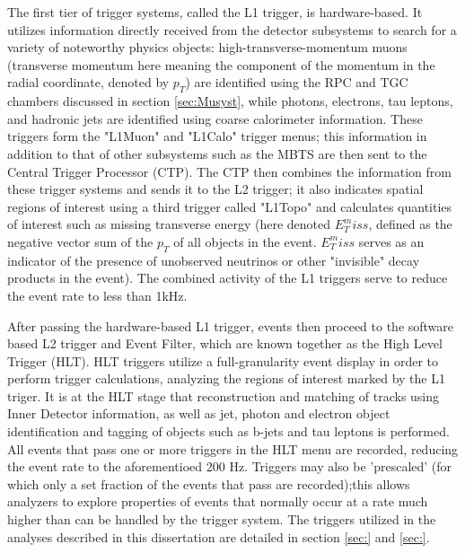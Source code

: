 The first tier of trigger systems, called the L1 trigger, is hardware-based. It utilizes information directly received from the detector subsystems to search for a variety of noteworthy physics objects: high-transverse-momentum muons (transverse momentum here meaning the component of the momentum in the radial coordinate, denoted by $p_T$) are identified using the RPC and TGC chambers discussed in section \ref{sec:Musyst}, while photons, electrons, tau leptons, and hadronic jets are identified using coarse calorimeter information. These triggers form the "L1Muon" and "L1Calo" trigger menus; this information in addition to that of other subsystems such as the MBTS are then sent to the Central Trigger Processor (CTP). The CTP then combines the information from these trigger systems and sends it to the L2 trigger; it also indicates spatial regions of interest using a third trigger called "L1Topo" and calculates quantities of interest such as missing transverse energy (here denoted $E_T^miss$, defined as the negative vector sum of the $p_T$ of all objects in the event. $E_T^miss$ serves as an indicator of the presence of unobserved neutrinos or other "invisible" decay products in the event). The combined activity of the L1 triggers serve to reduce the event rate to less than 1kHz.

After passing the hardware-based L1 trigger, events then proceed to the software based L2 trigger and Event Filter, which are known together as the High Level Trigger (HLT). HLT triggers utilize a full-granularity event display in order to perform trigger calculations, analyzing the regions of interest marked by the L1 triger. It is at the HLT stage that reconstruction and matching of tracks using Inner Detector information, as well as jet, photon and electron object identification and tagging of objects such as b-jets and tau leptons is performed. All events that pass one or more triggers in the HLT menu are recorded, reducing the event rate to the aforementioed 200 Hz. Triggers may also be 'prescaled' (for which only a set fraction of the events that pass are recorded);this allows analyzers to explore properties of events that normally occur at a rate much higher than can be handled by the trigger system. The triggers utilized in the analyses described in this dissertation are detailed in section \ref{sec:} and \ref{sec:}.

